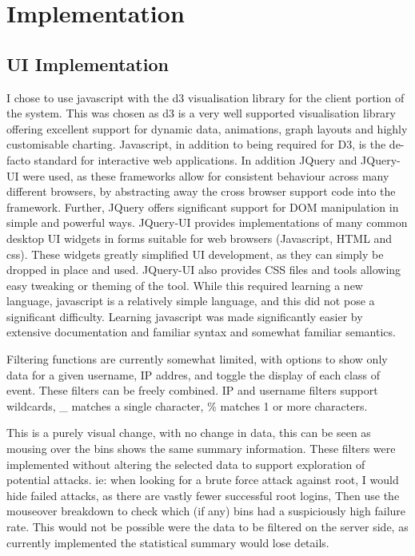 \chapter{Implementation}\label{C:impl}

\section{UI Implementation}\label{imp_ui} 

I chose to use javascript with the d3 visualisation library \cite{bostock2011d3} for the client portion of the system. This was chosen as d3 is a very well supported visualisation library offering excellent support for dynamic data, animations, graph layouts and highly customisable charting. Javascript, in addition to being required for D3, is the de-facto standard for interactive web applications. 
In addition JQuery and JQuery-UI were used, as these frameworks allow for consistent behaviour across many different browsers, by abstracting away the cross browser support code into the framework. Further, JQuery offers significant support for DOM manipulation in simple and powerful ways. JQuery-UI provides implementations of many common desktop UI widgets in forms suitable for web browsers (Javascript, HTML and css). These widgets greatly simplified UI development, as they can simply be dropped in place and used. JQuery-UI also provides CSS files and tools allowing easy tweaking or theming of the tool.
While this required learning a new language, javascript is a relatively simple language, and this did not pose a significant difficulty. Learning javascript was made significantly easier by extensive documentation and familiar syntax and somewhat familiar semantics. 

Filtering functions are currently somewhat limited, with options to show only data for a given username, IP addres, and toggle the display of each class of event. These filters can be freely combined. IP and username filters support wildcards, \_ matches a single character, \% matches 1 or more characters. 

This is a purely visual change, with no change in data, this can be seen as mousing over the bins shows the same summary information. These filters were implemented without altering the selected data to support exploration of potential attacks. ie: when looking for a brute force attack against root, I would hide failed attacks, as there are vastly fewer successful root logins, Then use the mouseover breakdown to check which (if any) bins had a suspiciously high failure rate. This would not be possible were the data to be filtered on the server side, as currently implemented the statistical summary would lose details.


